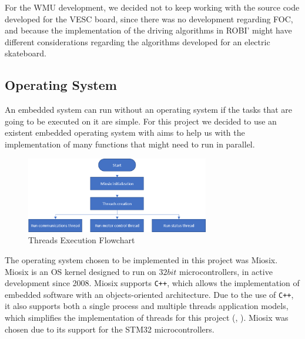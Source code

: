 For the \ac{WMU} development, we decided not to keep working with the source code developed for the VESC board, since there was no development regarding \ac{FOC}, and because the implementation of the driving algorithms in ROBI' might have different considerations regarding the algorithms developed for an electric skateboard.

\subsection{Operating System}

An embedded system can run without an operating system if the tasks that are going to be executed on it are simple. For this project we decided to use an existent embedded operating system with aims to help us with the implementation of many functions that might need to run in parallel.

\begin{figure}[htbp]
\centering
\includegraphics[width=8cm]{Images/flowcharts/threads_flow.png} 
\caption[Threads Execution Flowchart]{Threads Execution Flowchart}
\label{fig:threads_flow}
\end{figure}

The operating system chosen to be implemented in this project was Miosix. Miosix is an OS kernel designed to run on $32bit$ microcontrollers, in active development since 2008. Miosix supports \texttt{C++}, which allows the implementation of embedded software with an objects-oriented architecture. Due to the use of \texttt{C++}, it also supports both a single process and multiple threads application models, which simplifies the implementation of threads for this project (\citeauthor{miosix}, \citeyear{miosix}). Miosix was chosen due to its support for the STM32 microcontrollers.

